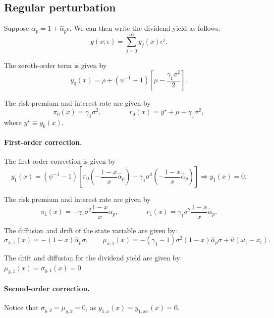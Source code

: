\documentclass[11pt,english]{article}
\begin{document}
\subsection{Regular perturbation}

Suppose $\overline{\alpha}_p = 1 + \hat{\alpha}_p \epsilon$. We can then write the dividend-yield  as follows:
\begin{equation}
    y(x;\epsilon) = \sum_{j=0}^\infty y_{j}(x) \epsilon^j.
\end{equation}

The zeroth-order term is given by
\begin{equation}
    y_0(x) =  \rho + \left(\psi^{-1}-1\right) \left[\mu - \frac{\gamma_1 \sigma^2}{2}  \right].  
\end{equation}

The risk-premium and interest rate are given by
\begin{equation}
    \pi_0(x) = \gamma_1 \sigma^2, \qquad \qquad 
    r_0(x) = y^\star + \mu  - \gamma_1 \sigma^2,
\end{equation}
where $y^\star \equiv y_0(x)$.

\paragraph{First-order correction.} The first-order correction is given by
\begin{equation}
    y_1(x) = (\psi^{-1}-1) \left[ \pi_0\left( -\frac{1-x}{x} \hat{\alpha}_p \right) - \gamma_1 \sigma^2 \left( - \frac{1-x}{x} \hat{\alpha}_p\right) \right] \Rightarrow y_1(x) = 0.
\end{equation}

The risk premium and interest rate are given by
\begin{equation}
    \pi_1(x) = -\gamma_1 \sigma^2  \frac{1-x}{x} \hat{\alpha}_p, \qquad \qquad 
    r_1(x) = \gamma_1 \sigma^2  \frac{1-x}{x} \hat{\alpha}_p.
\end{equation}

The diffusion and drift of the state variable are given by:
\begin{equation}
    \sigma_{x,1}(x) = -(1-x) \hat{\alpha}_p \sigma, \qquad \mu_{x,1}(x) = -(\gamma_1 -1)\sigma^2 (1-x) \hat{\alpha}_p \sigma + \hat{\kappa} (\omega_1 - x_t).
\end{equation}

The drift and diffusion for the dividend yield are given by $\mu_{y,1}(x) = \sigma_{y,1}(x) = 0$.

\paragraph{Second-order correction.} 
Notice that $\sigma_{y,2} = \mu_{y,2} = 0$, as $y_{1,x}(x)= y_{1,xx}(x) = 0$. 
\end{document}
